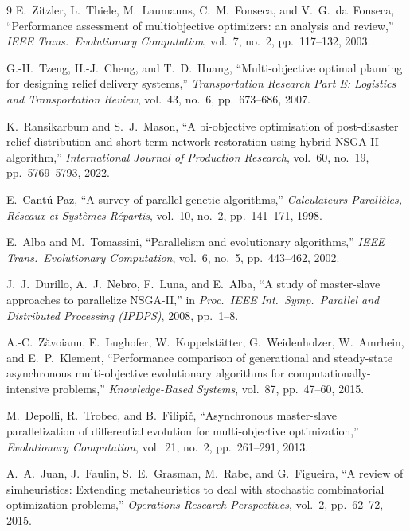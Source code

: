 \documentclass[10pt,conference,letterpaper]{IEEEtran}
\begin{document}
\begin{thebibliography}{9}
E.~Zitzler, L.~Thiele, M.~Laumanns, C.~M.~Fonseca, and V.~G.~da~Fonseca,
``Performance assessment of multiobjective optimizers: an analysis and
review,''
\emph{IEEE Trans.\ Evolutionary Computation}, vol.~7, no.~2,
pp.~117--132, 2003.

G.-H.~Tzeng, H.-J.~Cheng, and T.~D.~Huang, ``Multi-objective optimal
planning for designing relief delivery systems,''
\emph{Transportation Research Part E: Logistics and Transportation
Review}, vol.~43, no.~6, pp.~673--686, 2007.

K.~Ransikarbum and S.~J.~Mason, ``A bi-objective optimisation of
post-disaster relief distribution and short-term network restoration
using hybrid NSGA-II algorithm,''
\emph{International Journal of Production Research}, vol.~60, no.~19,
pp.~5769--5793, 2022.

E.~Cant{\'u}-Paz, ``A survey of parallel genetic algorithms,''
\emph{Calculateurs Parall{\`e}les, R{\'e}seaux et Syst{\`e}mes
R{\'e}partis}, vol.~10, no.~2, pp.~141--171, 1998.

E.~Alba and M.~Tomassini, ``Parallelism and evolutionary algorithms,''
\emph{IEEE Trans.\ Evolutionary Computation}, vol.~6, no.~5,
pp.~443--462, 2002.

J.~J.~Durillo, A.~J.~Nebro, F.~Luna, and E.~Alba, ``A study of
master-slave approaches to parallelize NSGA-II,'' in \emph{Proc.\ IEEE
Int.\ Symp.\ Parallel and Distributed Processing (IPDPS)}, 2008,
pp.~1--8.

A.-C.~Z{\u{a}}voianu, E.~Lughofer, W.~Koppelst{\"a}tter,
G.~Weidenholzer, W.~Amrhein, and E.~P.~Klement, ``Performance comparison
of generational and steady-state asynchronous multi-objective evolutionary
algorithms for computationally-intensive problems,''
\emph{Knowledge-Based Systems}, vol.~87, pp.~47--60, 2015.

M.~Depolli, R.~Trobec, and B.~Filipi{\v{c}}, ``Asynchronous master-slave
parallelization of differential evolution for multi-objective
optimization,''
\emph{Evolutionary Computation}, vol.~21, no.~2, pp.~261--291, 2013.

A.~A.~Juan, J.~Faulin, S.~E.~Grasman, M.~Rabe, and G.~Figueira, ``A review
of simheuristics: Extending metaheuristics to deal with stochastic
combinatorial optimization problems,''
\emph{Operations Research Perspectives}, vol.~2, pp.~62--72, 2015.

\end{thebibliography}
\end{document}
